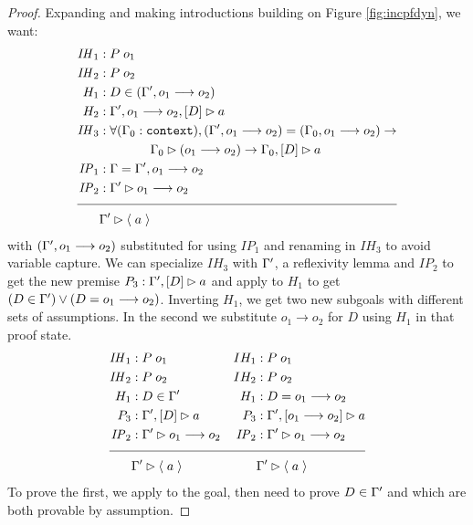 \begin{proof}
Expanding and making introductions building on Figure \ref{fig:incpfdyn}, we want:
\begin{align*}
\mathit{IH}_1 &: P \; o_1 \\
\mathit{IH}_2 &: P \; o_2 \\
H_1 &: D \in (\inddyncon{} , o_1 \longrightarrow o_2) \\
H_2 &: \bchsl[\inddyncon{} , o_1 \longrightarrow o_2]{D}{a} \\
\mathit{IH}_3 &: \forall (\dyncon{}_0 : \sltm{context}), (\inddyncon{} , o_1 \longrightarrow o_2) = (\dyncon{}_0 , o_1 \longrightarrow o_2) \rightarrow \\
& \qquad\qquad \seqsl[\dyncon{}_0]{(o_1 \longrightarrow o_2)} \rightarrow \bchsl[\dyncon{}_0]{D}{a} \\
\mathit{IP}_1 &: \dyncon{} = \inddyncon{} , o_1 \longrightarrow o_2 \\
\mathit{IP}_2 &: \seqsl[\inddyncon{}]{o_1 \longrightarrow o_2} \\[\pfshift{}]
\cline{1-2}
& \seqsl[\inddyncon{}]{\atom{a}}
\end{align*}
with $(\inddyncon{} , o_1 \longrightarrow o_2)$ substituted for \dyncon{} using $\mathit{IP}_1$ and renaming in $\mathit{IH}_3$ to avoid variable capture. We can specialize $\mathit{IH}_3$ with $\inddyncon{}$, a reflexivity lemma and $\mathit{IP}_2$ to get the new premise $P_3 : \bchsl[\inddyncon{}]{D}{a}$ and apply  to $H_1$ to get $(D \in \inddyncon{}) \vee (D = o_1 \longrightarrow o_2)$. Inverting $H_1$, we get two new subgoals with different sets of assumptions. In the second we substitute $o_1 \longrightarrow o_2$ for $D$ using $H_1$ in that proof state.
\begin{align*}
\mathit{IH}_1 &: P \; o_1  & IH_1 &: P \; o_1 \\
\mathit{IH}_2 &: P \; o_2  & IH_2 &: P \; o_2 \\
H_1 &: D \in \inddyncon{}  & H_1 &: D = o_1 \longrightarrow o_2 \\
P_3 &: \bchsl[\inddyncon{}]{D}{a}  & P_3 &: \bchsl[\inddyncon{}]{o_1 \longrightarrow o_2}{a} \\
\mathit{IP}_2 &: \seqsl[\inddyncon{}]{o_1 \longrightarrow o_2}  &\mathit{IP}_2 &: \seqsl[\inddyncon{}]{o_1 \longrightarrow o_2} \\[\pfshift{}]
\cline{1-4}
& \seqsl[\inddyncon{}]{\atom{a}} &&\seqsl[\inddyncon{}]{\atom{a}}
\end{align*}
To prove the first, we apply \rlnmsinit{} to the goal, then need to prove $D \in \inddyncon{}$ and  which are both provable by assumption.


\end{proof}
